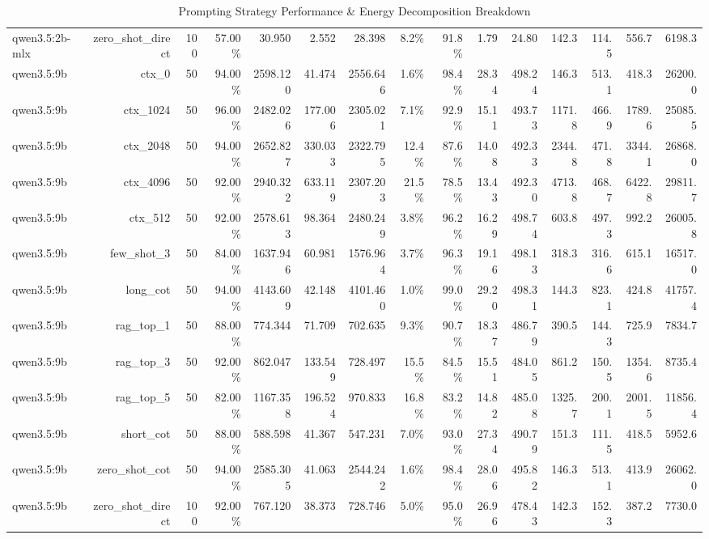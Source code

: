 \begin{table}[t]
\begin{tabular}{lrrrrrrrrrrrrrr}
qwen3.5:2b-mlx & zero\_shot\_direct & 100 & 57.00\% & 30.950 & 2.552 & 28.398 & 8.2\% & 91.8\% & 1.79 & 24.80 & 142.3 & 114.5 & 556.7 & 6198.3 \\
qwen3.5:9b & ctx\_0 & 50 & 94.00\% & 2598.120 & 41.474 & 2556.646 & 1.6\% & 98.4\% & 28.34 & 498.24 & 146.3 & 513.1 & 418.3 & 26200.0 \\
qwen3.5:9b & ctx\_1024 & 50 & 96.00\% & 2482.026 & 177.006 & 2305.021 & 7.1\% & 92.9\% & 15.11 & 493.73 & 1171.8 & 466.9 & 1789.6 & 25085.5 \\
qwen3.5:9b & ctx\_2048 & 50 & 94.00\% & 2652.827 & 330.033 & 2322.795 & 12.4\% & 87.6\% & 14.08 & 492.33 & 2344.8 & 471.8 & 3344.1 & 26868.0 \\
qwen3.5:9b & ctx\_4096 & 50 & 92.00\% & 2940.322 & 633.119 & 2307.203 & 21.5\% & 78.5\% & 13.43 & 492.30 & 4713.8 & 468.7 & 6422.8 & 29811.7 \\
qwen3.5:9b & ctx\_512 & 50 & 92.00\% & 2578.613 & 98.364 & 2480.249 & 3.8\% & 96.2\% & 16.29 & 498.74 & 603.8 & 497.3 & 992.2 & 26005.8 \\
qwen3.5:9b & few\_shot\_3 & 50 & 84.00\% & 1637.946 & 60.981 & 1576.964 & 3.7\% & 96.3\% & 19.16 & 498.13 & 318.3 & 316.6 & 615.1 & 16517.0 \\
qwen3.5:9b & long\_cot & 50 & 94.00\% & 4143.609 & 42.148 & 4101.460 & 1.0\% & 99.0\% & 29.20 & 498.31 & 144.3 & 823.1 & 424.8 & 41757.4 \\
qwen3.5:9b & rag\_top\_1 & 50 & 88.00\% & 774.344 & 71.709 & 702.635 & 9.3\% & 90.7\% & 18.37 & 486.79 & 390.5 & 144.3 & 725.9 & 7834.7 \\
qwen3.5:9b & rag\_top\_3 & 50 & 92.00\% & 862.047 & 133.549 & 728.497 & 15.5\% & 84.5\% & 15.51 & 484.05 & 861.2 & 150.5 & 1354.6 & 8735.4 \\
qwen3.5:9b & rag\_top\_5 & 50 & 82.00\% & 1167.358 & 196.524 & 970.833 & 16.8\% & 83.2\% & 14.82 & 485.08 & 1325.7 & 200.1 & 2001.5 & 11856.4 \\
qwen3.5:9b & short\_cot & 50 & 88.00\% & 588.598 & 41.367 & 547.231 & 7.0\% & 93.0\% & 27.34 & 490.79 & 151.3 & 111.5 & 418.5 & 5952.6 \\
qwen3.5:9b & zero\_shot\_cot & 50 & 94.00\% & 2585.305 & 41.063 & 2544.242 & 1.6\% & 98.4\% & 28.06 & 495.82 & 146.3 & 513.1 & 413.9 & 26062.0 \\
qwen3.5:9b & zero\_shot\_direct & 100 & 92.00\% & 767.120 & 38.373 & 728.746 & 5.0\% & 95.0\% & 26.96 & 478.43 & 142.3 & 152.3 & 387.2 & 7730.0 \\
\bottomrule
\end{tabular}
\caption{Prompting Strategy Performance & Energy Decomposition Breakdown}
\label{tab:2_strategy_comparison}
\end{table}
